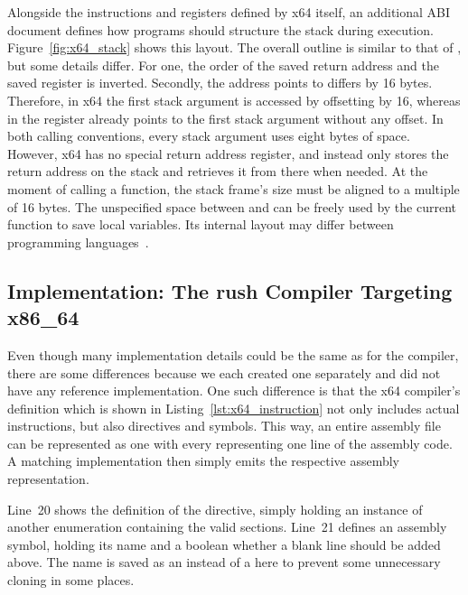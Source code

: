 Alongside the instructions and registers defined by x64 itself, an additional ABI document defines how programs should structure the stack during execution.
Figure~\ref{fig:x64_stack} shows this layout.
The overall outline is similar to that of \riscv{}, but some details differ.
For one, the order of the saved return address and the saved  register is inverted.
Secondly, the address  points to differs by 16 bytes.
Therefore, in x64 the first stack argument is accessed by offsetting  by 16, whereas in \riscv{} the  register already points to the first stack argument without any offset.
In both calling conventions, every stack argument uses eight bytes of space.
However, x64 has no special return address register, and instead only stores the return address on the stack and retrieves it from there when needed.
At the moment of calling a function, the stack frame's size must be aligned to a multiple of 16 bytes.
The unspecified space between  and  can be freely used by the current function to save local variables.
Its internal layout may differ between programming languages~\cite[p.~21]{Lu2022}.

\subsection{Implementation: The rush Compiler Targeting x86\_64}


Even though many implementation details could be the same as for the \riscv{} compiler, there are some differences because we each created one separately and did not have any reference implementation.
One such difference is that the x64 compiler's  definition which is shown in Listing~\ref{lst:x64_instruction} not only includes actual instructions, but also directives and symbols.
This way, an entire assembly file can be represented as one  with every  representing one line of the assembly code.
A matching  implementation then simply emits the respective assembly representation.

Line~20 shows the definition of the  directive, simply holding an instance of another enumeration containing the valid sections.
Line~21 defines an assembly symbol, holding its name and a boolean whether a blank line should be added above.
The name is saved as an  instead of a  here to prevent some unnecessary cloning in some places.

